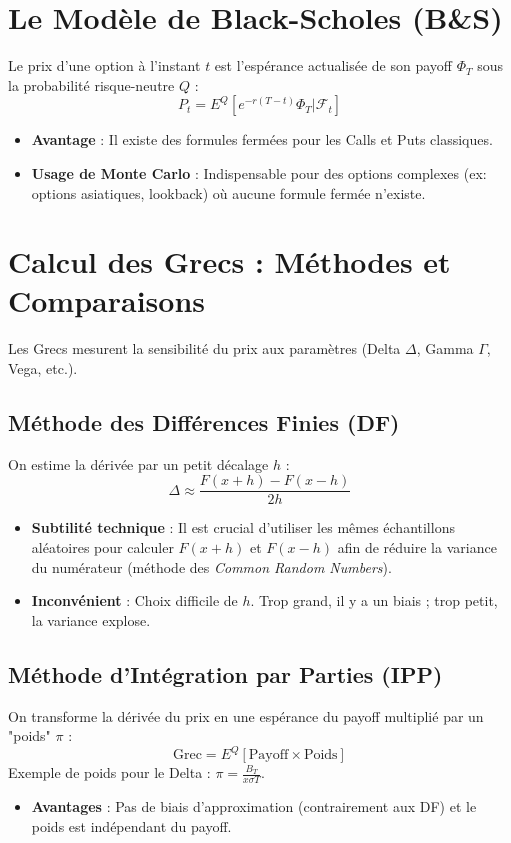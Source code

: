 \documentclass{article}
\begin{document}
\section{Le Modèle de Black-Scholes (B\&S)}
Le prix d'une option à l'instant $t$ est l'espérance actualisée de son payoff $\Phi_T$ sous la probabilité risque-neutre $Q$ :
\[
P_t = E^Q [e^{-r(T-t)} \Phi_T | \mathcal{F}_t ]
\]
\begin{itemize}
    \item \textbf{Avantage} : Il existe des formules fermées pour les Calls et Puts classiques.
    \item \textbf{Usage de Monte Carlo} : Indispensable pour des options complexes (ex: options asiatiques, lookback) où aucune formule fermée n'existe.
\end{itemize}

\section{Calcul des Grecs : Méthodes et Comparaisons}
Les Grecs mesurent la sensibilité du prix aux paramètres (Delta $\Delta$, Gamma $\Gamma$, Vega, etc.).

\subsection{Méthode des Différences Finies (DF)}
On estime la dérivée par un petit décalage $h$ :
\[
\Delta \approx \frac{F(x+h) - F(x-h)}{2h}
\]
\begin{itemize}
    \item \textbf{Subtilité technique} : Il est crucial d'utiliser les mêmes échantillons aléatoires pour calculer $F(x+h)$ et $F(x-h)$ afin de réduire la variance du numérateur (méthode des \textit{Common Random Numbers}).
    \item \textbf{Inconvénient} : Choix difficile de $h$. Trop grand, il y a un biais ; trop petit, la variance explose.
\end{itemize}

\subsection{Méthode d'Intégration par Parties (IPP)}
On transforme la dérivée du prix en une espérance du payoff multiplié par un "poids" $\pi$ :
\[
\text{Grec} = E^Q [\text{Payoff} \times \text{Poids}]
\]
Exemple de poids pour le Delta : $\pi = \frac{B_T}{x \sigma T}$.
\begin{itemize}
    \item \textbf{Avantages} : Pas de biais d'approximation (contrairement aux DF) et le poids est indépendant du payoff.
\end{itemize}
\end{document}
